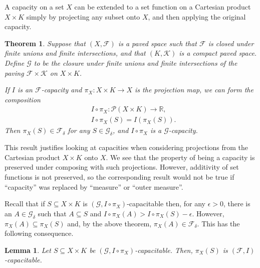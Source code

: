 \documentclass[12pt]{article}
\newtheorem*{theorem*}{Theorem}
\newtheorem*{lemma*}{Lemma}
\begin{document}

A capacity on a set $X$ can be extended to a set function on a Cartesian product $X\times K$ simply by projecting any subset onto $X$, and then applying the original capacity.

\begin{theorem*}
Suppose that $(X,\mathcal{F})$ is a paved space such that $\mathcal{F}$ is closed under finite unions and finite intersections, and that $(K,\mathcal{K})$ is a compact paved space.
Define $\mathcal{G}$ to be the closure under finite unions and finite intersections of the paving $\mathcal{F}\times\mathcal{K}$ on $X\times K$.

If $I$ is an $\mathcal{F}$-capacity and $\pi_X\colon X\times K\to X$ is the projection map, we can form the composition
\begin{align*}
&I\circ\pi_X\colon\mathcal{P}(X\times K)\to\mathbb{R},\\
&I\circ\pi_X(S) = I(\pi_X(S)).
\end{align*}
Then $\pi_X(S)\in \mathcal{F}_\delta$ for any $S\in\mathcal{G}_\delta$, and $I\circ\pi_X$ is a $\mathcal{G}$-capacity.
\end{theorem*}

This result justifies looking at capacities when considering projections from the Cartesian product $X\times K$ onto $X$. We see that the property of being a capacity is preserved under composing with such projections. However, additivity of set functions is not preserved, so the corresponding result would not be true if  ``capacity'' was replaced by ``measure'' or ``outer measure''.

Recall that if $S\subseteq X\times K$ is $(\mathcal{G},I\circ\pi_X)$-capacitable then, for any $\epsilon>0$, there is an $A\in\mathcal{G}_\delta$ such that $A\subseteq S$ and $I\circ\pi_X(A)>I\circ\pi_X(S)-\epsilon$. However, $\pi_X(A)\subseteq\pi_X(S)$ and, by the above theorem, $\pi_X(A)\in\mathcal{F}_\delta$. This has the following consequence.
\begin{lemma*}
Let $S\subseteq X\times K$ be $(\mathcal{G},I\circ\pi_X)$-capacitable. Then, $\pi_X(S)$ is $(\mathcal{F},I)$-capacitable.
\end{lemma*}

\end{document}
